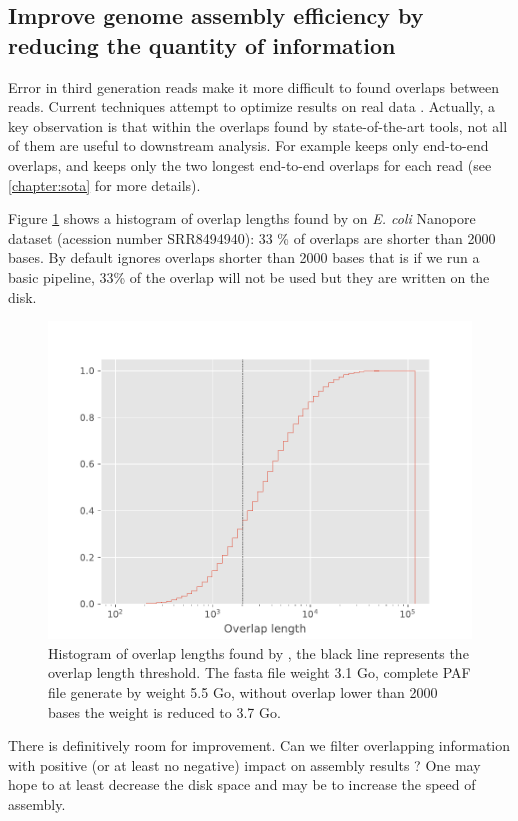 \documentclass[main.tex]{subfiles}
\begin{document}
\subsection{Improve genome assembly efficiency by reducing the quantity of information} \label{sec:preasm:intro_fpa}

Error in third generation reads make it more difficult to found overlaps between reads. Current techniques attempt to optimize results on real data \cite{ovl_bench}.
Actually, a key observation is that within the overlaps found by state-of-the-art tools, not all of them are useful to downstream analysis. For example \miniasm keeps only end-to-end overlaps, and \canu keeps only the two longest end-to-end overlaps for each read (see \ref{chapter:sota} for more details).

Figure \ref{intro:fig:length_overlap_histogram} shows a histogram of overlap lengths found by \minimap on \textit{E. coli} Nanopore dataset (acession number SRR8494940): 33 \% of overlaps are shorter than 2000 bases. By default \miniasm ignores overlaps shorter than 2000 bases that is if we run a basic \miniasm pipeline, 33\% of the overlap will not be used but they are written on the disk.  
\begin{figure}
    \centering
    \includegraphics[width=\textwidth]{introduction/images/overlap_length.pdf}
    \caption{Histogram of overlap lengths found by \minimap, the black line represents the \miniasm overlap length threshold. The fasta file weight 3.1 Go, complete PAF file generate by \minimap weight 5.5 Go, without overlap lower than 2000 bases the weight is reduced to 3.7 Go.}
    \label{intro:fig:length_overlap_histogram}
\end{figure}
There is definitively room for improvement. Can we filter overlapping information with positive (or at least no negative) impact on assembly results ? One may hope to at least decrease the disk space and may be to increase the speed of assembly.
\end{document}
